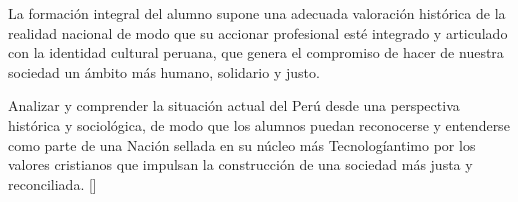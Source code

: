 \begin{syllabus}


\begin{justification}
La formación integral del alumno supone una adecuada valoración histórica de la realidad nacional de modo que su accionar profesional esté integrado y articulado con la identidad cultural peruana, que genera el compromiso de hacer de nuestra sociedad un ámbito más humano, solidario y justo.
\end{justification}

\begin{goals}
\item Analizar y comprender la situación actual del Perú desde una perspectiva histórica y sociológica, de modo que los alumnos puedan reconocerse y entenderse como parte de una Nación sellada en su núcleo más Tecnologíantimo por los valores cristianos que impulsan la construcción de una sociedad más justa y reconciliada.  [\Familiarity]
\end{goals}

\begin{outcomes}
    \item {}
    \item {}
\end{outcomes}

\begin{competences}
    \item {}
\end{competences}


\end{syllabus}
